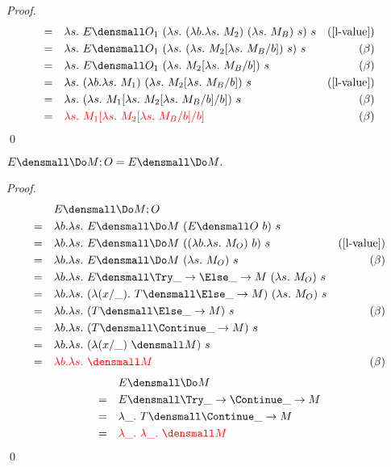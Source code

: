 \begin{theorem}
\begin{proof}
\begin{align*}
            =& \quad \lambda s.~ E\den{O_1} ~(\lambda s. ~(\lambda b. \lambda s.~ M_2) ~(\lambda s.~ M_B) ~s) ~s & (\cref{l-value})\\
            =& \quad \lambda s.~ E\den{O_1} ~(\lambda s. ~(\lambda s.~ M_2\subst{b}{\lambda s.~ M_B}) ~s) ~s & (\beta) \\
            =& \quad \lambda s.~ E\den{O_1} ~(\lambda s. ~M_2\subst{b}{\lambda s.~ M_B}) ~s & (\beta)\\
            =& \quad \lambda s.~ (\lambda b. \lambda s.~ M_1) ~(\lambda s. ~M_2\subst{b}{\lambda s.~ M_B}) ~s & (\cref{l-value})\\
            =& \quad \lambda s.~ (\lambda s.~ M_1\subst{b}{\lambda s. ~M_2\subst{b}{\lambda s.~ M_B}}) ~s & (\beta)\\
            =& \quad \color{red}{\lambda s.~ M_1\subst{b}{\lambda s. ~M_2\subst{b}{\lambda s.~ M_B}}} & (\beta)
        \end{align*}
        \qed
    \end{proof}
\end{theorem}

\begin{theorem}
    $ E\den{\Do M; O} = E\den{\Do M}.$
    \begin{proof}
        \begin{align*}
            &\quad E\den{\Do M; O} \\
            =& \quad \lambda b. \lambda s.~ E\den{\Do M} ~(E\den{O} ~b) ~s \\
            =& \quad \lambda b. \lambda s.~ E\den{\Do M} ~((\lambda b. \lambda s.~ M_O) ~b) ~s & (\cref{l-value})\\
            =& \quad \lambda b. \lambda s.~ E\den{\Do M} ~(\lambda s.~ M_O) ~s & (\beta)\\
            =& \quad \lambda b. \lambda s.~ E\den{\Try \_ \to \Else \_ \to M} ~(\lambda s.~ M_O) ~s \\
            =& \quad \lambda b. \lambda s.~ (\lambda (x/\_). ~T\den{\Else \_ \to M}) ~(\lambda s.~ M_O) ~s \\
            =& \quad \lambda b. \lambda s.~ (T\den{\Else \_ \to M}) ~s & (\beta)\\
            =& \quad \lambda b. \lambda s.~ (T\den{\Continue \_ \to M}) ~s \\
            =& \quad \lambda b. \lambda s.~ (\lambda(x/\_) ~ \den{M}) ~s \\
            =& \quad \color{red}{\lambda b. \lambda s.~ \den{M}} & (\beta)
        \end{align*}
        \begin{align*}
            &\quad E\den{\Do M} \\
            =&\quad E\den{\Try \_ \to \Continue \_ \to M} \\
            =& \quad \lambda \_. ~T\den{\Continue \_ \to M} \\
            =& \quad \color{red}{\lambda \_. ~\lambda \_. ~  \den{M}}
        \end{align*}
        \qed
    \end{proof}
\end{theorem}

